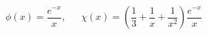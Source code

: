 \begin{equation}
\phi (x) = \frac{e^{-x}}{x}, ~~~~~~~ \chi (x) = (\frac{1}{3} + \frac{1}{x} +
\frac{1}{x^{2}}) \frac{e^{-x}}{x}               \label{eq:bx}
\end{equation}

